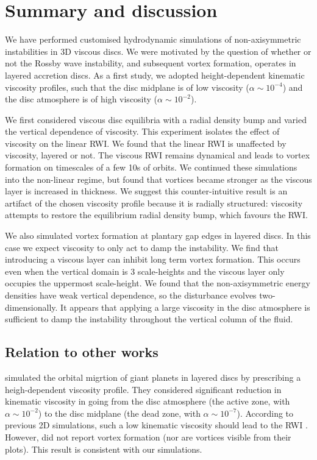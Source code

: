 \section{Summary and discussion}\label{summary}
We have performed customised hydrodynamic simulations of
non-axisymmetric instabilities in 3D viscous discs. We were motivated  
by the question of whether or not the Rossby wave instability, and
subsequent vortex formation, operates in layered accretion discs.  As
a first study, we adopted height-dependent kinematic viscosity
profiles, such that the disc midplane is of low viscosity ($\alpha\sim
10^{-4}$) and the disc atmosphere is of high viscosity ($\alpha\sim
10^{-2}$). 

We first considered viscous disc equilibria with a radial density
bump and varied the vertical dependence of viscosity. 
This experiment isolates the effect of viscosity on the
linear RWI. We found that the linear RWI is unaffected by viscosity,
layered or not. The viscous RWI remains dynamical and leads to vortex
formation on timescales of a few 10s of orbits. We continued these
simulations into the non-linear regime, but found that vortices became
stronger as the viscous layer is increased in thickness. We suggest this
counter-intuitive result is an artifact of the chosen viscosity
profile because it is radially structured: viscosity attempts to
restore the equilibrium radial density bump, which favours the
RWI. 

We also simulated vortex formation at plantary gap edges in layered
discs. In this case we expect viscosity to only act to damp the
instability. We find that introducing a viscous layer can inhibit long
term vortex formation. This occurs even when the vertical domain is 3
scale-heights and the viscous layer only occupies the uppermost
scale-height. We found that the non-axisymmetric energy densities have
weak vertical dependence, so the disturbance evolves
two-dimensionally. It appears that applying a large viscosity in the
disc atmosphere is sufficient to damp the instability throughout the
vertical column of the fluid.  

\subsection{Relation to other works}
\cite{pierens10} simulated the orbital migrtion of giant planets in
layered discs by prescribing a heigh-dependent viscosity profile. They
considered significant reduction in kinematic viscosity in going from
the disc atmosphere (the active zone, with $\alpha\sim10^{-2}$) to the
disc midplane (the dead zone, with $\alpha\sim10^{-7}$). According to
previous 2D simulations, such a low kinematic viscosity should lead to
the RWI \citep{valborro06,valborro07}. However, \citeauthor{pierens10}
did not report vortex formation (nor are vortices visible from their
plots). This result is consistent with our simulations. 

